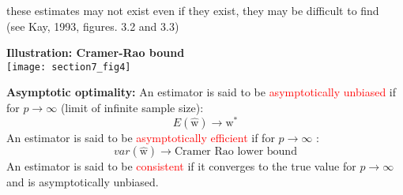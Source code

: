 \begin{itemize}
        \itR these estimates may not exist
        \itR even if they exist, they may be difficult to find \\
                (see Kay, 1993,  figures. 3.2 and 3.3)
\end{itemize}

\textbf{Illustration: Cramer-Rao bound}\\
\texttt{[image: section7\_fig4]}  

\textbf{Asymptotic optimality:}
An estimator is said to be \textcolor{red}{asymptotically unbiased} if for $p \to \infty$ (limit of infinite sample size):
$$
E(\hat{\mathrm{w}}) \to {\mathrm{w}}^*
$$
An estimator is said to be \textcolor{red}{asymptotically efficient} if for $p \to \infty$ :
$$
var(\hat{\mathrm{w}}) \to \text{Cramer Rao lower bound}
$$
An estimator is said to be \textcolor{red}{consistent} if it converges to the true value for $p \to \infty$ and is asymptotically unbiased. 
\vspace{9mm}


